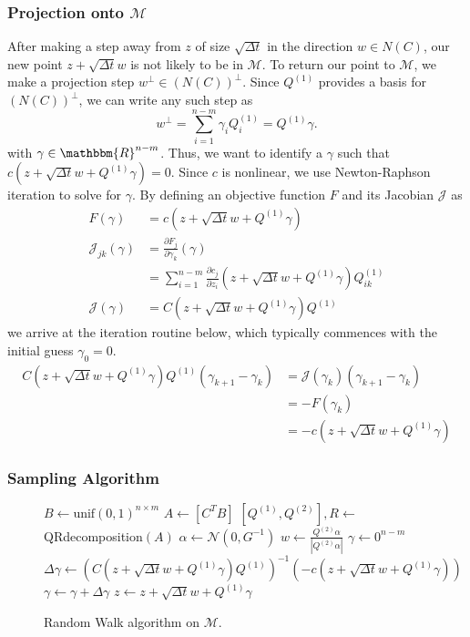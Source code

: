 \subsubsection{Projection onto $\mathcal{M}$}
After making a step away from $z$ of size $\sqrt{\Delta t}$ in the direction $w \in N(C)$, our new point $z + \sqrt{\Delta t}w$ is not likely to be in $\mathcal{M}$. To return our point to $\mathcal{M}$, we make a projection step $w^\perp \in (N(C))^\perp$. Since $Q^{(1)}$ provides a basis for $(N(C))^\perp$, we can write any such step as 
$$w^\perp = \sum_{i=1}^{n-m} \gamma_iQ^{(1)}_i = Q^{(1)}\gamma.$$
with $\gamma \in \mathbbm{R}^{n-m}$. Thus, we want to identify a $\gamma$ such that $c(z + \sqrt{\Delta t} w + Q^{(1)}\gamma) = 0$. Since $c$ is nonlinear, we use Newton-Raphson iteration to solve for $\gamma$. By defining an objective function $F$ and its Jacobian $\mathcal{J}$ as
\begin{align}
        F(\gamma) &= c(z + \sqrt{\Delta t} w + Q^{(1)}\gamma) \\
        \mathcal{J}_{jk}(\gamma) &= \frac{\partial F_j}{\partial \gamma_k}(\gamma) \\
        &= \sum_{i=1}^{n-m} \frac{\partial c_j}{\partial z_i}(z + \sqrt{\Delta t} w + Q^{(1)}\gamma)Q^{(1)}_{ik} \\
        \mathcal{J}(\gamma) &= C(z + \sqrt{\Delta t} w + Q^{(1)}\gamma)Q^{(1)}
\end{align}
we arrive at the iteration routine below, which typically commences with the initial guess $\gamma_0 = 0$.
\begin{align}
        C(z + \sqrt{\Delta t} w + Q^{(1)}\gamma)Q^{(1)}\left(\gamma_{k+1} - \gamma_{k}\right) &= \mathcal{J}(\gamma_k)\left(\gamma_{k+1} - \gamma_{k}\right)\\
         &= -F(\gamma_k) \\
         &= -c(z + \sqrt{\Delta t} w + Q^{(1)}\gamma)
\end{align}

\subsubsection{Sampling Algorithm}

\begin{figure}[ht]
\centering
\begin{algorithmic}
        \State $B \gets \text{unif}(0,1)^{n\times m}$       
        \State $A \gets \left[C^T B\right]$
        \State $[Q^{(1)}, Q^{(2)}], R \gets$QRdecomposition$(A)$
        \State $\alpha \gets \mathcal{N}(0,G^{-1})$
        \State $w \gets \frac{Q^{(2)}\alpha}{|Q^{(2)}\alpha|}$
        \State $\gamma \gets 0^{n-m}$
                     \State $\Delta\gamma \gets (C(z + \sqrt{\Delta t} w + Q^{(1)}\gamma)Q^{(1)})^{-1}(-c(z + \sqrt{\Delta t} w + Q^{(1)}\gamma))$
                     \State $\gamma \gets \gamma + \Delta\gamma$
        \EndWhile   
        \State $z \gets z + \sqrt{\Delta t}w + Q^{(1)}\gamma$
\EndFor
\end{algorithmic}
\caption{Random Walk algorithm on $\mathcal{M}$.}
\label{alg:MBMRW}
\end{figure}


